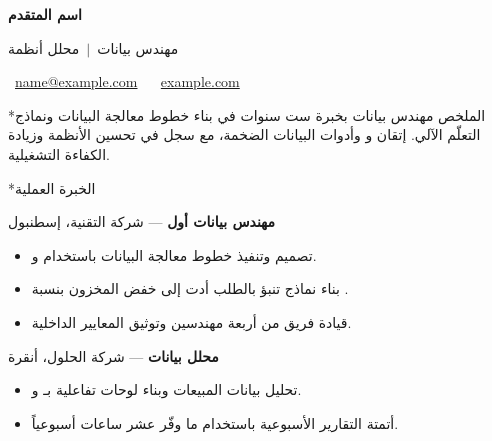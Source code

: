 \documentclass[10pt,a4paper]{article}
\makeatletter
\let\oldsection\section
\renewcommand{\section}{\@ifstar{\sectionstar}{\oldsection}}
\newcommand{\sectionstar}[1]{\oldsection*{#1}\vspace{-0.4em}{\color{rule}\hrule height 0.4pt}\vspace{0.25em}}
\makeatother
\begin{document}
\thispagestyle{empty}
\begin{center}
{\LARGE\bfseries\color{accent} اسم المتقدم\par}
\vspace{0.2em}
{\normalsize مهندس بيانات \,$\vert$\, محلل أنظمة\par}
\vspace{0.4em}
{\small
\faEnvelope~\href{mailto:name@example.com}{name@example.com} \quad
\faPhone~ \quad
\faGlobe~\href{https://example.com}{example.com} \quad
\faMapMarker~
\par}
\end{center}

\vspace{0.3em}

\section*{الملخص}
مهندس بيانات بخبرة ست سنوات في بناء خطوط معالجة البيانات ونماذج التعلّم الآلي.
إتقان  و وأدوات البيانات الضخمة، مع سجل في تحسين الأنظمة
وزيادة الكفاءة التشغيلية.

\section*{الخبرة العملية}

\textbf{مهندس بيانات أول} — شركة التقنية، إسطنبول \hfill {}
\begin{itemize}
\item تصميم وتنفيذ خطوط معالجة البيانات باستخدام  و.
\item بناء نماذج تنبؤ بالطلب أدت إلى خفض المخزون بنسبة .
\item قيادة فريق من أربعة مهندسين وتوثيق المعايير الداخلية.
\end{itemize}

\textbf{محلل بيانات} — شركة الحلول، أنقرة \hfill {}
\begin{itemize}
\item تحليل بيانات المبيعات وبناء لوحات تفاعلية بـ و.
\item أتمتة التقارير الأسبوعية باستخدام  ما وفّر عشر ساعات أسبوعياً.
\end{itemize}
\end{document}
